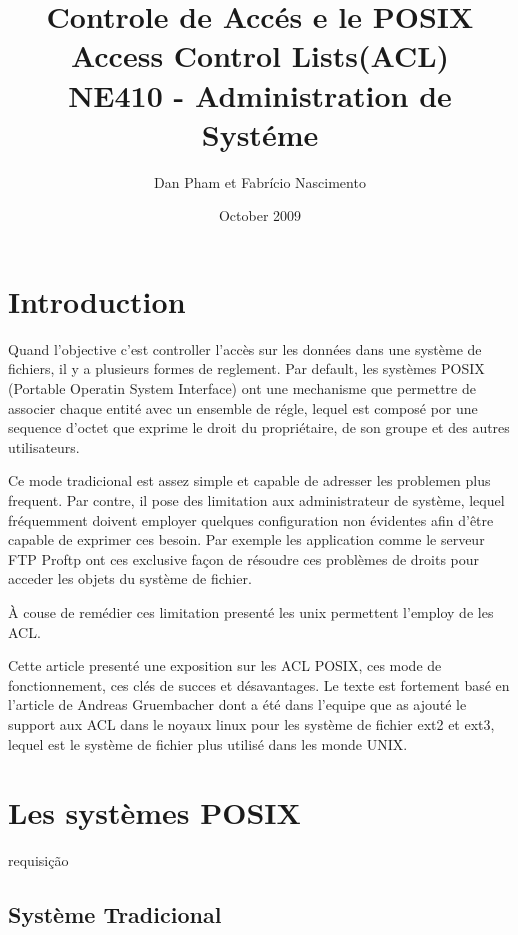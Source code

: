 \documentclass[draft]{article}
\title{\textbf{Controle de Accés e le POSIX Access Control Lists(ACL)} \\ NE410 - Administration de Systéme }
\author{Dan Pham et Fabrício Nascimento}
\date{October 2009}
\begin{document}
\maketitle
\newpage
\section*{Introduction}

Quand l'objective c'est controller l'accès sur les données dans une système de fichiers, il y a plusieurs formes de reglement. Par default, les systèmes POSIX (Portable Operatin System Interface)\cite{ieee1,ieee2} ont une mechanisme que permettre de associer chaque entité avec un ensemble de régle, lequel est composé por une sequence d'octet que exprime le droit du propriétaire, de son groupe et des autres utilisateurs. 

Ce mode tradicional est assez simple et capable de adresser les problemen plus frequent. Par contre, il pose des limitation aux administrateur de système, lequel fréquemment doivent employer quelques configuration non évidentes afin d'être capable de exprimer ces besoin. Par exemple les application comme le serveur FTP Proftp\cite{ftp} ont ces exclusive façon de résoudre ces problèmes de droits pour acceder les objets du système de fichier.

À couse de remédier ces limitation presenté les unix permettent l'employ de les ACL.   

Cette article presenté une exposition sur les ACL POSIX, ces mode de fonctionnement, ces clés de succes et désavantages. Le texte est fortement basé en l'article de Andreas Gruembacher\cite{aclsuse} dont a été dans l'equipe que as ajouté le support aux ACL dans le noyaux linux pour les système de fichier ext2 et ext3, lequel est le système de fichier plus utilisé dans les monde UNIX.

\section*{Les systèmes POSIX}

requisição


\subsection*{Système Tradicional}
\end{document}
